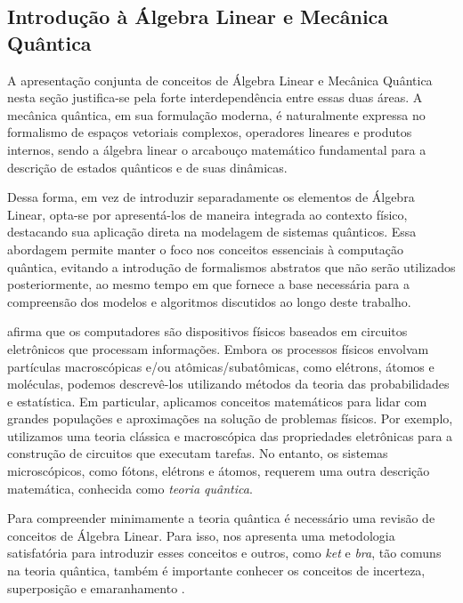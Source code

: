 \subsection{Introdução à Álgebra Linear e Mecânica Quântica}\label{subsec:linear_algebra_quantum_mecanichs}

A apresentação conjunta de conceitos de Álgebra Linear e Mecânica Quântica nesta seção justifica-se pela forte interdependência entre essas duas áreas. A mecânica quântica, em sua formulação moderna, é naturalmente expressa no formalismo de espaços vetoriais complexos, operadores lineares e produtos internos, sendo a álgebra linear o arcabouço matemático fundamental para a descrição de estados quânticos e de suas dinâmicas.

Dessa forma, em vez de introduzir separadamente os elementos de Álgebra Linear, opta-se por apresentá-los de maneira integrada ao contexto físico, destacando sua aplicação direta na modelagem de sistemas quânticos. Essa abordagem permite manter o foco nos conceitos essenciais à computação quântica, evitando a introdução de formalismos abstratos que não serão utilizados posteriormente, ao mesmo tempo em que fornece a base necessária para a compreensão dos modelos e algoritmos discutidos ao longo deste trabalho.

\textcite{Schuld2021} afirma que os computadores são dispositivos físicos baseados em circuitos eletrônicos que processam informações. Embora os processos físicos envolvam partículas macroscópicas e/ou atômicas/subatômicas, como elétrons, átomos e moléculas, podemos descrevê-los utilizando métodos da teoria das probabilidades e estatística. Em particular, aplicamos conceitos matemáticos para lidar com grandes populações e aproximações na solução de problemas físicos. Por exemplo, utilizamos uma teoria clássica e macroscópica das propriedades eletrônicas para a construção de circuitos que executam tarefas. No entanto, os sistemas microscópicos, como fótons, elétrons e átomos, requerem uma outra descrição matemática, conhecida como \textit{teoria quântica}.

Para compreender minimamente a teoria quântica é necessário uma revisão de conceitos de Álgebra Linear. Para isso, \textcite{Almeida2020} nos apresenta uma metodologia satisfatória para introduzir esses conceitos e outros, como \textit{ket} e \textit{bra}, tão comuns na teoria quântica, também é importante conhecer os conceitos de incerteza, superposição e emaranhamento \cite{hewitt2000fundamentos, mahon2000mecanica}. 

